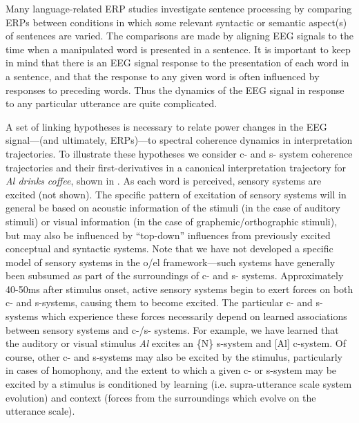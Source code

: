  Many language-related ERP studies investigate sentence processing by comparing ERPs between conditions in which some relevant syntactic or semantic aspect(s) of sentences are varied. The comparisons are made by aligning EEG signals to the time when a manipulated word is presented in a sentence. It is important to keep in mind that there is an EEG signal response to the presentation of each word in a sentence, and that the response to any given word is often influenced by responses to preceding words. Thus the dynamics of the EEG signal in response to any particular utterance are quite complicated. 

A set of linking hypotheses is necessary to relate power changes in the EEG signal—(and ultimately, ERPs)—to spectral coherence dynamics in interpretation trajectories. To illustrate these hypotheses we consider c- and s- system coherence trajectories and their first-derivatives in a canonical interpretation trajectory for \textit{Al drinks coffee}, shown in {}. As each word is perceived, sensory systems are excited (not shown). The specific pattern of excitation of sensory systems will in general be based on acoustic information of the stimuli (in the case of auditory stimuli) or visual information (in the case of graphemic/orthographic stimuli), but may also be influenced by “top-down” influences from previously excited conceptual and syntactic systems. Note that we have not developed a specific model of sensory systems in the o/el framework—such systems have generally been subsumed as part of the surroundings of c- and s- systems. Approximately 40-50ms after stimulus onset, active sensory systems begin to exert forces on both c- and s-systems, causing them to become excited. The particular c- and s-systems which experience these forces necessarily depend on learned associations between sensory systems and c-/s- systems. For example, we have learned that the auditory or visual stimulus \textit{Al} excites an \{N\} s-system and [Al] c-system. Of course, other c- and s-systems may also be excited by the stimulus, particularly in cases of homophony, and the extent to which a given c- or s-system may be excited by a stimulus is conditioned by learning (i.e. supra-utterance scale system evolution) and context (forces from the surroundings which evolve on the utterance scale).

